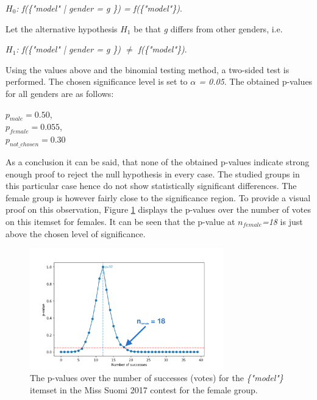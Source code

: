 \begin{center}
    \emph{$H_0$: f(\{"model" | gender = g \}) = f(\{"model"\})}. 
\end{center}

Let the alternative hypothesis \emph{$H_1$} be that \emph{g} differs from other genders, i.e. 

\begin{center}
    \emph{$H_1$: f(\{"model" | gender = g \}) $\neq$ f(\{"model"\})}. 
\end{center}

Using the values above and the binomial testing method, a two-sided test is performed. The chosen significance level is set to \emph{$\alpha$ = 0.05}. The obtained p-values for all genders are as follows:

\begin{center}
    $p_{male}=0.50$, \\
    $p_{female}=0.055$, \\
    $p_{not\_chosen}=0.30$
\end{center}

As a conclusion it can be said, that none of the obtained p-values indicate strong enough proof to reject the null hypothesis in every case. The studied groups in this particular case hence do not show statistically significant differences. The female group is however fairly close to the significance region. To provide a visual proof on this observation, Figure \ref{likelihood_distribution_females} displays the p-values over the number of votes on this itemset for females. It can be seen that the p-value at \emph{$n_{female}$=18} is just above the chosen level of significance. 

\begin{figure}[h]
    \begin{center}
        \includegraphics[width=0.75\textwidth]{Images/likelihood_distribution_females.png}
        \caption{The p-values over the number of successes (votes) for the \emph{\{"model"\}} itemset in the Miss Suomi 2017 contest for the female group.}
        \label{likelihood_distribution_females}
    \end{center}
\end{figure}

